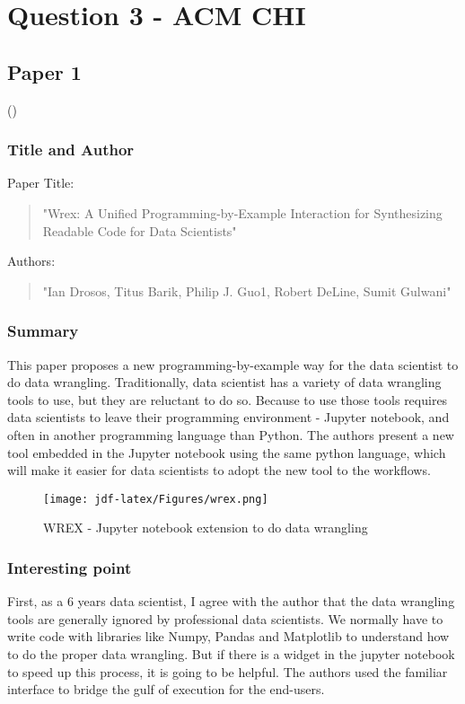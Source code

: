 \documentclass[
	letterpaper, %
]{jdf}
\begin{document}
\section{Question 3 - ACM CHI}

\subsection{Paper 1}
(\cite{10.1145/3313831.3376442})
\subsubsection{Title and Author}
Paper Title:
\begin{quotation}
\noindent "Wrex: A Unified Programming-by-Example Interaction for Synthesizing Readable Code for Data Scientists" 
\end{quotation}

Authors:
\begin{quotation}
\noindent "Ian Drosos, Titus Barik, Philip J. Guo1, Robert DeLine, Sumit Gulwani"
\end{quotation}

\subsubsection{Summary}
This paper proposes a new programming-by-example way for the data scientist to do data wrangling. Traditionally, data scientist has a variety of data wrangling tools to use, but they are reluctant to do so. Because to use those tools requires data scientists to leave their programming environment - Jupyter notebook, and often in another programming language than Python. The authors present a new tool embedded in the Jupyter notebook using the same python language, which will make it easier for data scientists to adopt the new tool to the workflows.

\begin{figure}[h]
	\centering
	\texttt{[image: jdf-latex/Figures/wrex.png]}
	\caption{WREX - Jupyter notebook extension to do data wrangling}
	\label{fig:wrex}
\end{figure}

\subsubsection{Interesting point}
First, as a 6 years data scientist, I agree with the author that the data wrangling tools are generally ignored by professional data scientists. We normally have to write code with libraries like Numpy, Pandas and Matplotlib to understand how to do the proper data wrangling. But if there is a widget in the jupyter notebook to speed up this process, it is going to be helpful. The authors used the familiar interface to bridge the gulf of execution for the end-users. 
\end{document}
